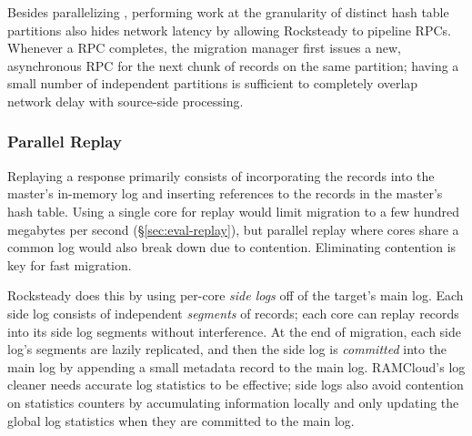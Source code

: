 Besides parallelizing \pulls, performing work at the granularity of distinct
hash table partitions also hides network latency by allowing Rocksteady to pipeline
RPCs.  Whenever a \pull RPC completes, the migration manager first issues a
new, asynchronous \pull RPC for the next chunk of records on the same
partition; having a small number of independent partitions is sufficient to
completely overlap network delay with source-side \pull processing.

\subsubsection{Parallel Replay}

Replaying a \pull response primarily consists of incorporating the records into
the master's in-memory log and inserting references to the records in the
master's hash table.  Using a single core for replay would limit migration to a
few hundred megabytes per second (\S\ref{sec:eval-replay}),  but parallel replay where
cores share a common log would also break down due to contention.  Eliminating
contention is key for fast migration.

Rocksteady does this by using per-core {\em side logs} off of the target's main
log. Each side log consists of independent {\em segments} of records; each core
can replay records into its side log segments without interference. At the end
of migration, each side log's segments are lazily replicated, and then the side
log is {\em committed} into the main log by appending a small metadata record
to the main log. RAMCloud's log cleaner needs accurate log statistics to be
effective; side logs also avoid contention on statistics counters by
accumulating information locally and only updating the global log statistics
when they are committed to the main log.

